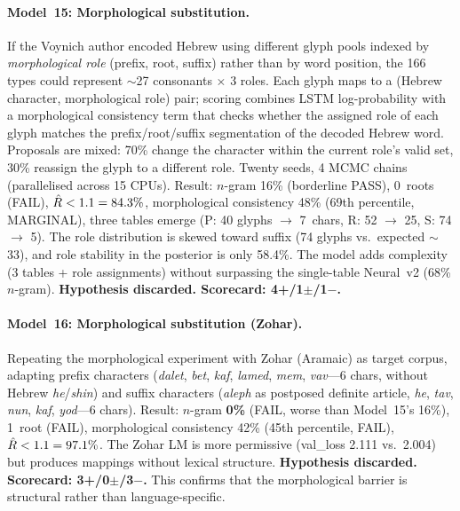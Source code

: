 \paragraph{Model~15: Morphological substitution.}
If the Voynich author encoded Hebrew using different glyph pools indexed by \emph{morphological role} (prefix, root, suffix) rather than by word position, the 166 types could represent $\sim$27 consonants $\times$ 3 roles.  Each glyph maps to a (Hebrew character, morphological role) pair; scoring combines LSTM log-probability with a morphological consistency term that checks whether the assigned role of each glyph matches the prefix/root/suffix segmentation of the decoded Hebrew word.  Proposals are mixed: 70\% change the character within the current role's valid set, 30\% reassign the glyph to a different role.  Twenty seeds, 4 MCMC chains (parallelised across 15 CPUs).  Result: $n$-gram 16\% (borderline PASS), 0~roots (FAIL), $\hat{R} < 1.1 = 84.3\%$, morphological consistency 48\% (69th percentile, MARGINAL), three tables emerge (P: 40 glyphs $\to$ 7~chars, R: 52 $\to$ 25, S: 74 $\to$ 5).  The role distribution is skewed toward suffix (74 glyphs vs.\ expected $\sim$33), and role stability in the posterior is only 58.4\%.  The model adds complexity (3 tables + role assignments) without surpassing the single-table Neural~v2 (68\% $n$-gram).  \textbf{Hypothesis discarded.  Scorecard: 4+/1$\pm$/1$-$.}

\paragraph{Model~16: Morphological substitution (Zohar).}
Repeating the morphological experiment with Zohar (Aramaic) as target corpus, adapting prefix characters (\emph{dalet}, \emph{bet}, \emph{kaf}, \emph{lamed}, \emph{mem}, \emph{vav}---6 chars, without Hebrew \emph{he}/\emph{shin}) and suffix characters (\emph{aleph} as postposed definite article, \emph{he}, \emph{tav}, \emph{nun}, \emph{kaf}, \emph{yod}---6 chars).  Result: $n$-gram \textbf{0\%} (FAIL, worse than Model~15's 16\%), 1~root (FAIL), morphological consistency 42\% (45th percentile, FAIL), $\hat{R} < 1.1 = 97.1\%$.  The Zohar LM is more permissive (val\_loss 2.111 vs.\ 2.004) but produces mappings without lexical structure.  \textbf{Hypothesis discarded.  Scorecard: 3+/0$\pm$/3$-$.}  This confirms that the morphological barrier is structural rather than language-specific.

